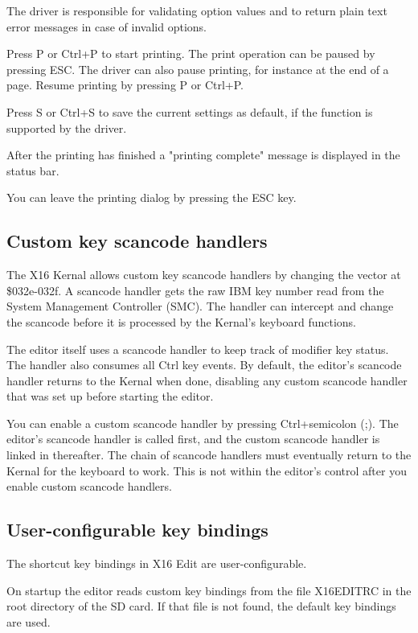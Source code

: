 \documentclass{article}
\begin{document}
        The driver is responsible for validating option values and to return plain text
        error messages in case of invalid options.

        Press P or Ctrl+P to start printing. The print operation can be paused by
        pressing ESC. The driver can also pause printing, for instance at the end of a page.
        Resume printing by pressing P or Ctrl+P.

        Press S or Ctrl+S to save the current settings as default, if the function is 
        supported by the driver.

        After the printing has finished a "printing complete" message is displayed in
        the status bar.

        You can leave the printing dialog by pressing the ESC key.

    \subsection{Custom key scancode handlers}
        The X16 Kernal allows custom key scancode handlers by changing the vector
        at \$032e-032f. A scancode handler gets the raw IBM key number read from
        the System Management Controller (SMC). The handler can intercept and change
        the scancode before it is processed by the Kernal's keyboard functions.

        The editor itself uses a scancode handler to keep track of modifier key status. The
        handler also consumes all Ctrl key events. By default, the editor's scancode
        handler returns to the Kernal when done, disabling any custom scancode handler that
        was set up before starting the editor.

        You can enable a custom scancode handler by pressing Ctrl+semicolon (;). The editor's
        scancode handler is called first, and the custom scancode handler is linked in
        thereafter. The chain of scancode handlers must eventually return to the Kernal for
        the keyboard to work. This is not within the editor's control after you enable 
        custom scancode handlers.

    \subsection{User-configurable key bindings}
        The shortcut key bindings in X16 Edit are user-configurable.

        On startup the editor reads custom key bindings from the file X16EDITRC in the root directory
        of the SD card. If that file is not found, the default key bindings are
        used.
        
\end{document}
